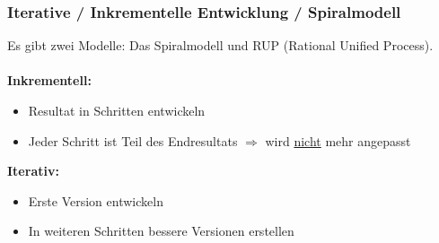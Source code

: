 \subsubsection{Iterative / Inkrementelle Entwicklung / Spiralmodell}
Es gibt zwei Modelle: Das Spiralmodell und RUP (Rational Unified Process).\\
\\
	\textbf{Inkrementell:}
		\begin{itemize}
			\item Resultat in Schritten entwickeln
			\item Jeder Schritt ist Teil des Endresultats \newline $\Rightarrow$ wird \underline{nicht} mehr angepasst
		\end{itemize}
	\textbf{Iterativ:}
		\begin{itemize}					
			\item Erste Version entwickeln
			\item In weiteren Schritten bessere Versionen erstellen
		\end{itemize}

